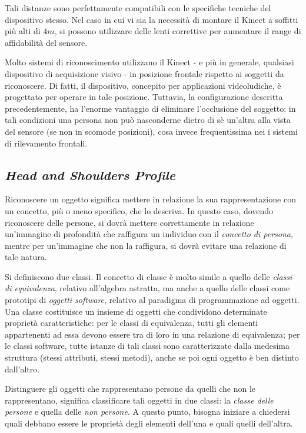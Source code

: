                 Tali distanze sono perfettamente compatibili con le specifiche tecniche del dispositivo stesso.
                Nel caso in cui vi sia la necessità di montare il Kinect a soffitti più alti di $4m$, si possono utilizzare delle lenti correttive per aumentare il range di affidabilità del sensore.

                Molto sistemi di riconoscimento utilizzano il Kinect - e più in generale, qualsiasi dispositivo di acquisizione visivo - in posizione frontale rispetto ai soggetti da riconoscere.
                Di fatti, il dispositivo, concepito per applicazioni videoludiche, è progettato per operare in tale posizione.
                Tuttavia, la configurazione descritta precedentemente, ha l'enorme vantaggio di eliminare l'occlusione del soggetto: in tali condizioni una persona non può nasconderne dietro di sè un'altra alla vista del sensore (se non in scomode posizioni), cosa invece frequentissima nei i sistemi di rilevamento frontali.

        \subsection{\emph{Head and Shoulders Profile}}
        \label{sub:hasp}
            Riconoscere un oggetto significa mettere in relazione la sua rappresentazione con un concetto, più o meno specifico, che lo descriva.
            In questo caso, dovendo riconoscere delle persone, si dovrà mettere correttamente in relazione un'immagine di profondità che raffigura un individuo con il \emph{concetto di persona}, mentre per un'immagine che non la raffigura, si dovrà evitare una relazione di tale natura.
            
            Si definiscono due classi.
            Il concetto di classe è molto simile a quello delle \emph{classi di equivalenza}, relativo all'algebra astratta, ma anche a quello delle classi come prototipi di \emph{oggetti software}, relativo al paradigma di programmazione ad oggetti.
            Una classe costituisce un insieme di oggetti che condividono determinate proprietà caratteristiche: 
            per le classi di equivalenza, tutti gli elementi appartenenti ad essa devono essere tra di loro in una relazione di equivalenza;
            per le classi software, tutte istanze di tali classi sono caratterizzate dalla medesima struttura (stessi attributi, stessi metodi), anche se poi ogni oggetto è ben distinto dall'altro. 

            Distinguere gli oggetti che rappresentano persone da quelli che non le rappresentano, significa classificare tali oggetti in due classi: la \emph{classe delle persone} e quella delle \emph{non persone}.
            A questo punto, bisogna iniziare a chiedersi quali debbano essere le proprietà degli elementi dell'una e quali quelli dell'altra.

